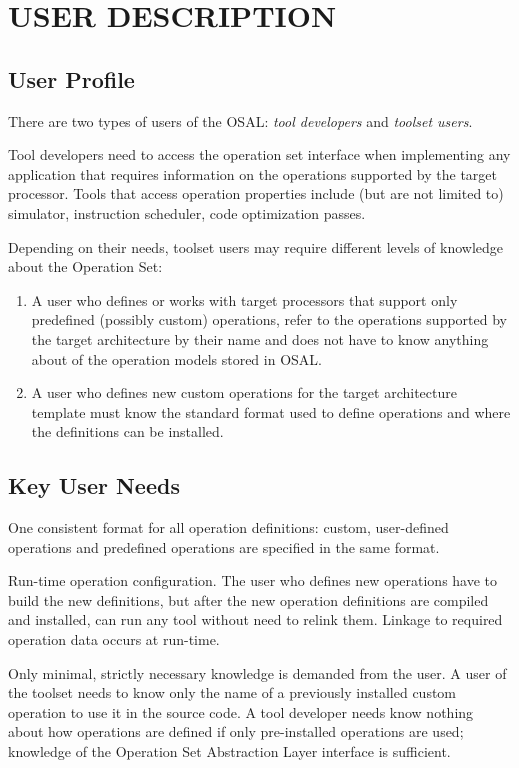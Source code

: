 \documentclass[twoside]{tce}
\begin{document}
\chapter{USER DESCRIPTION}

\section{User Profile}

There are two types of users of the OSAL: \emph{tool developers} and
\emph{toolset users}.

Tool developers need to access the operation set interface when implementing
any application that requires information on the operations supported by the
target processor. Tools that access operation properties include (but are
not limited to) simulator, instruction scheduler, code optimization passes.

Depending on their needs, toolset users may require different levels of
knowledge about the Operation Set:
\begin{enumerate}
\item %
  A user who defines or works with target processors that support only
  predefined (possibly custom) operations, refer to the operations supported
  by the target architecture by their name and does not have to know
  anything about of the operation models stored in OSAL.
\item %
  A user who defines new custom operations for the target architecture
  template must know the standard format used to define operations and where
  the definitions can be installed.
\end{enumerate}

\section{Key User Needs}

One consistent format for all operation definitions: custom, user-defined
operations and predefined operations are specified in the same format.

Run-time operation configuration. The user who defines new operations have
to build the new definitions, but after the new operation definitions are
compiled and installed, can run any tool without need to relink them.
Linkage to required operation data occurs at run-time.

Only minimal, strictly necessary knowledge is demanded from the user.
%
A user of the toolset needs to know only the name of a previously installed
custom operation to use it in the source code.
%
A tool developer needs know nothing about how operations are defined if only
pre-installed operations are used; knowledge of the Operation Set
Abstraction Layer interface is sufficient.
\end{document}
